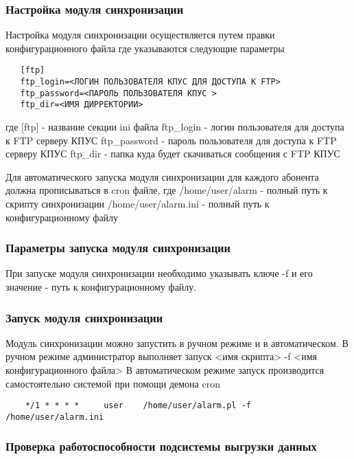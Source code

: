 \documentclass[12pt]{article}[a4paper,14pt,russian]
\begin{document}
   \subsubsection{Настройка модуля синхронизации}
   Настройка модуля синхронизации осуществляется путем правки конфигурационного файла где указываются следующие параметры
   \begin{verbatim}
   [ftp]
   ftp_login=<ЛОГИН ПОЛЬЗОВАТЕЛЯ КПУС ДЛЯ ДОСТУПА К FTP>
   ftp_password=<ПАРОЛЬ ПОЛЬЗОВАТЕЛЯ КПУС >
   ftp_dir=<ИМЯ ДИРРЕКТОРИИ>
   \end{verbatim}
  
   где
    [ftp] - название секции ini файла
    ftp\_login - логин пользователя для доступа к FTP серверу КПУС
    ftp\_password - пароль пользователя для доступа к FTP серверу КПУС
    ftp\_dir - папка куда будет  скачиваться сообщения с FTP КПУС
    
    Для автоматического запуска модуля синхронизации для каждого абонента должна прописываться в 
    cron файле, где 
    /home/user/alarm - полный путь к скрипту синхронизации
    /home/user/alarm.ini - полный путь к конфигурационному файлу
    \subsubsection{Параметры запуска модуля синхронизации}
    При запуске модуля синхронизации необходимо указывать ключе -f и его значение - путь к конфигурационному файлу.
    \subsubsection{Запуск модуля синхронизации}
    Модуль синхронизации можно запустить в ручном режиме и в автоматическом. В ручном режиме администратор выполняет запуск 
    <имя скрипта> -f <имя конфигурационного файла>
	В автоматическом режиме запуск производится самостоятельно системой при помощи демона cron
    \begin{verbatim}
    */1 * * * *     user    /home/user/alarm.pl -f /home/user/alarm.ini
    \end{verbatim}
    \subsubsection{Проверка работоспособности подсистемы выгрузки данных}
	
\end{document}
